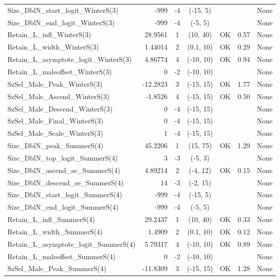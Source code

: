 \documentclass[12pt,]{article}
\begin{document}
\begin{landscape}
\begin{longtable}{lrcccll}
  Size\_DblN\_start\_logit\_WinterS(3) & -999 & -4 & (-15, 5) &  &  & None \\ 
  Size\_DblN\_end\_logit\_WinterS(3) & -999 & -4 & (-5, 5) &  &  & None \\ 
  Retain\_L\_infl\_WinterS(3) & 28.9561 & 1 & (10, 40) & OK & 0.57 & None \\ 
  Retain\_L\_width\_WinterS(3) & 1.44014 & 2 & (0.1, 10) & OK & 0.29 & None \\ 
  Retain\_L\_asymptote\_logit\_WinterS(3) & 4.86774 & 4 & (-10, 10) & OK & 0.94 & None \\ 
  Retain\_L\_maleoffset\_WinterS(3) & 0 & -2 & (-10, 10) &  &  & None \\ 
  SzSel\_Male\_Peak\_WinterS(3) & -12.2823 & 3 & (-15, 15) & OK & 1.77 & None \\ 
  SzSel\_Male\_Ascend\_WinterS(3) & -1.8526 & 4 & (-15, 15) & OK & 0.50 & None \\ 
  SzSel\_Male\_Descend\_WinterS(3) & 0 & -4 & (-15, 15) &  &  & None \\ 
  SzSel\_Male\_Final\_WinterS(3) & 0 & -4 & (-15, 15) &  &  & None \\ 
  SzSel\_Male\_Scale\_WinterS(3) & 1 & -4 & (-15, 15) &  &  & None \\ 
  Size\_DblN\_peak\_SummerS(4) & 45.2206 & 1 & (15, 75) & OK & 1.29 & None \\ 
  Size\_DblN\_top\_logit\_SummerS(4) & 3 & -3 & (-5, 3) &  &  & None \\ 
  Size\_DblN\_ascend\_se\_SummerS(4) & 4.89214 & 2 & (-4, 12) & OK & 0.15 & None \\ 
  Size\_DblN\_descend\_se\_SummerS(4) & 14 & -3 & (-2, 15) &  &  & None \\ 
  Size\_DblN\_start\_logit\_SummerS(4) & -999 & -4 & (-15, 5) &  &  & None \\ 
  Size\_DblN\_end\_logit\_SummerS(4) & -999 & -4 & (-5, 5) &  &  & None \\ 
  Retain\_L\_infl\_SummerS(4) & 29.2437 & 1 & (10, 40) & OK & 0.33 & None \\ 
  Retain\_L\_width\_SummerS(4) & 1.4909 & 2 & (0.1, 10) & OK & 0.12 & None \\ 
  Retain\_L\_asymptote\_logit\_SummerS(4) & 5.79317 & 4 & (-10, 10) & OK & 0.89 & None \\ 
  Retain\_L\_maleoffset\_SummerS(4) & 0 & -2 & (-10, 10) &  &  & None \\ 
  SzSel\_Male\_Peak\_SummerS(4) & -11.8309 & 3 & (-15, 15) & OK & 1.28 & None \\ 

\end{longtable}
\end{landscape}
\end{document}
